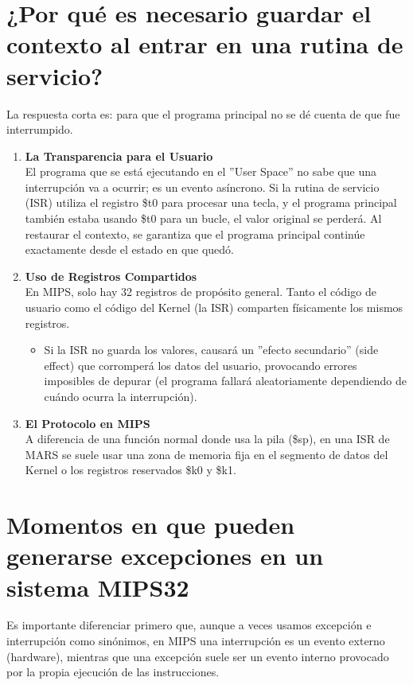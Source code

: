 \documentclass[]{article}
\begin{document}
\section{¿Por qué es necesario guardar el contexto al entrar en una rutina de servicio?}
	La respuesta corta es: para que el programa principal no se dé cuenta de que fue interrumpido.
	\begin{enumerate}
		\item \textbf{La Transparencia para el Usuario}\\
			El programa que se está ejecutando en el ''User Space'' no sabe que una interrupción va a ocurrir; es un evento asíncrono. Si la rutina de servicio (ISR) utiliza el registro \$t0 para procesar una tecla, y el programa principal también estaba usando \$t0 para un bucle, el valor original se perderá. Al restaurar el contexto, se garantiza que el programa principal continúe exactamente desde el estado en que quedó.
		\item \textbf{Uso de Registros Compartidos}\\
			En MIPS, solo hay 32 registros de propósito general. Tanto el código de usuario como el código del Kernel (la ISR) comparten físicamente los mismos registros.
			\begin{itemize}
				\item Si la ISR no guarda los valores, causará un ''efecto secundario'' (side effect) que corromperá los datos del usuario, provocando errores imposibles de depurar (el programa fallará aleatoriamente dependiendo de cuándo ocurra la interrupción).
			\end{itemize}
		\item \textbf{El Protocolo en MIPS}\\
			A diferencia de una función normal donde usa la pila (\$sp), en una ISR de MARS se suele usar una zona de memoria fija en el segmento de datos del Kernel o los registros reservados \$k0 y \$k1.
	\end{enumerate}
	
\section{Momentos en que pueden generarse excepciones en un sistema MIPS32}
	Es importante diferenciar primero que, aunque a veces usamos excepción e interrupción como sinónimos, en MIPS una interrupción es un evento externo (hardware), mientras que una excepción suele ser un evento interno provocado por la propia ejecución de las instrucciones.
\end{document}
